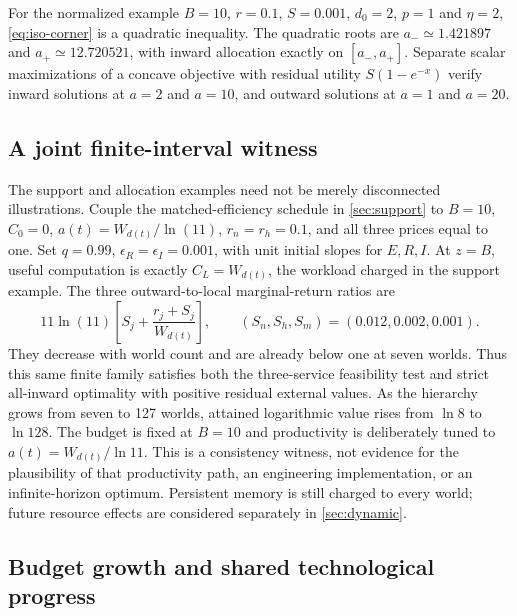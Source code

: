 \documentclass[11pt,a4paper]{article}
\theoremstyle{definition}\newtheorem{definition}{Definition}
\begin{document}
For the normalized example $B=10$, $r=0.1$, $S=0.001$, $d_0=2$,
$p=1$ and $\eta=2$, \eqref{eq:iso-corner} is a quadratic inequality.
The quadratic roots are $a_-\simeq1.421897$ and $a_+\simeq12.720521$, with inward
allocation exactly on $[a_-,a_+]$. Separate scalar maximizations of a
concave objective with residual utility $S(1-e^{-x})$ verify inward
solutions at $a=2$ and $a=10$, and outward solutions at $a=1$ and $a=20$.

\subsection{A joint finite-interval witness}

The support and allocation examples need not be merely disconnected illustrations. Couple the matched-efficiency schedule in \cref{sec:support} to $B=10$, $C_0=0$, $a(t)=W_{d(t)}/\ln(11)$, $r_n=r_h=0.1$, and all three prices equal to one. Set $q=0.99$, $\epsilon_R=\epsilon_I=0.001$, with unit initial slopes for $E,R,I$. At $z=B$, useful computation is exactly $C_L=W_{d(t)}$, the workload charged in the support example. The three outward-to-local marginal-return ratios are
\begin{equation}
 11\ln(11)\left[S_j+\frac{r_j+S_j}{W_{d(t)}}\right],
 \qquad(S_n,S_h,S_m)=(0.012,0.002,0.001).
 \label{eq:joint-witness}
\end{equation}
They decrease with world count and are already below one at seven worlds. Thus this same finite family satisfies both the three-service feasibility test and strict all-inward optimality with positive residual external values. As the hierarchy grows from seven to 127 worlds, attained logarithmic value rises from $\ln8$ to $\ln128$. The budget is fixed at $B=10$ and productivity is deliberately tuned to $a(t)=W_{d(t)}/\ln 11$. This is a consistency witness, not evidence for the plausibility of that productivity path, an engineering implementation, or an infinite-horizon optimum. Persistent memory is still charged to every world; future resource effects are considered separately in \cref{sec:dynamic}.

\subsection{Budget growth and shared technological progress}
\end{document}
